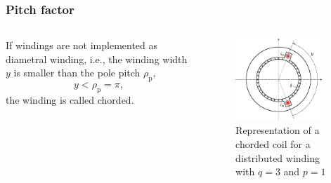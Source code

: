 \begin{frame}
	\frametitle{Pitch factor}
    \begin{columns}
		\begin{column}{0.6\textwidth}
	        If windings are not implemented as diametral winding, i.e., the winding width $y$ is smaller than the pole pitch $\rho_\mathrm{p}$, 
            $$y < \rho_\mathrm{p}=\pi,$$
            the winding is called chorded. 
        \end{column}
        \begin{column}{0.4\textwidth}
            \begin{figure}
                \centering
                \includegraphics[width=0.9\textwidth]{fig/lec05/Single_phase_chording.pdf}
                \caption{Representation of a chorded coil for a distributed winding with $q=3$ and $p=1$}
                \label{fig:Single_phase_chording}
            \end{figure}
        \end{column}
    \end{columns}
\end{frame}

